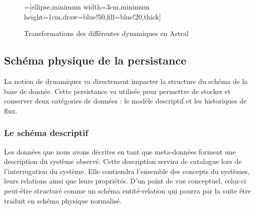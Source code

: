\begin{figure}[ht]
    \centering
{}=[ellipse,minimum width=3cm,minimum height=1cm,draw=blue!50,fill=blue!20,thick]
\caption{Transformations des différentes dynamiques en Astral}\label{fig:contrib:asteroid:theorie:dynamics}
\end{figure}

\subsection{Schéma physique de la persistance}
La notion de dynamiques va directement impacter la structure du schéma de la base de donnée. Cette persistance va utilisée pour permettre de stocker et conserver deux catégories de données : le modèle descriptif et les historiques de flux.
\subsubsection{Le schéma descriptif}
Les données que nous avons décrites en tant que meta-données forment une description du système observé. Cette description servira de catalogue lors de l'interrogation du système. Elle contiendra l'ensemble des concepts du systèmes, leurs relations ainsi que leurs propriétés. D'un point de vue conceptuel, celui-ci peut-être structuré comme un schéma entité-relation qui pourra par la suite être traduit en schéma physique normalisé.

